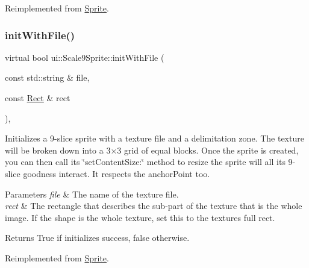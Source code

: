 Reimplemented from \hyperlink{classSprite_aaf44b73e6e009525f1cd222985a5ed4f}{Sprite}.

\mbox{\label{classui_1_1Scale9Sprite_a8ec4db44e4fdf3b0a4cdfef646dbdd6a}} 
\subsubsection{\texorpdfstring{init\+With\+File()}{initWithFile()}\hspace{0.1cm}{\footnotesize\ttfamily [7/8]}}
{\footnotesize\ttfamily virtual bool ui\+::\+Scale9\+Sprite\+::init\+With\+File (\begin{DoxyParamCaption}\item[{const std\+::string \&}]{file,  }\item[{const \hyperlink{classRect}{Rect} \&}]{rect }\end{DoxyParamCaption})\hspace{0.3cm}{\ttfamily [override]}, {\ttfamily [virtual]}}

Initializes a 9-\/slice sprite with a texture file and a delimitation zone. The texture will be broken down into a 3×3 grid of equal blocks. Once the sprite is created, you can then call its \char`\"{}set\+Content\+Size\+:\char`\"{} method to resize the sprite will all it\textquotesingle{}s 9-\/slice goodness interact. It respects the anchor\+Point too.


\begin{DoxyParams}{Parameters}
{\em file} & The name of the texture file. \\
\hline
{\em rect} & The rectangle that describes the sub-\/part of the texture that is the whole image. If the shape is the whole texture, set this to the texture\textquotesingle{}s full rect. \\
\hline
\end{DoxyParams}
\begin{DoxyReturn}{Returns}
True if initializes success, false otherwise. 
\end{DoxyReturn}


Reimplemented from \hyperlink{classSprite_af94c86a971b4ebab60cdd884e8902c06}{Sprite}.

\mbox{\label{classui_1_1Scale9Sprite_a2c5a440147b13f433454d65a20a31398}} 

